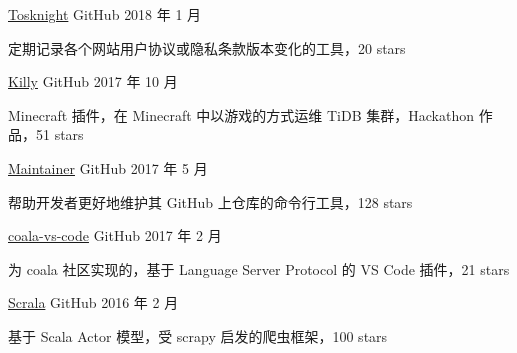 

\begin{cventries}

  \cventry
    {} %
    {\href{https://github.com/siglt/tosknight}{Tosknight}} %
    {GitHub} %
    {2018 年 1 月} %
    {
      \begin{cvitems} %
        \item 定期记录各个网站用户协议或隐私条款版本变化的工具，20 stars
      \end{cvitems}
    }

  \cventry
    {} %
    {\href{https://github.com/prism-river/killy}{Killy}} %
    {GitHub} %
    {2017 年 10 月} %
    {
      \begin{cvitems} %
        \item Minecraft 插件，在 Minecraft 中以游戏的方式运维 TiDB 集群，Hackathon 作品，51 stars
      \end{cvitems}
    }

  \cventry
    {} %
    {\href{https://github.com/gaocegege/maintainer}{Maintainer}} %
    {GitHub} %
    {2017 年 5 月} %
    {
      \begin{cvitems} %
        \item 帮助开发者更好地维护其 GitHub 上仓库的命令行工具，128 stars
      \end{cvitems}
    }

  \cventry
    {} %
    {\href{https://github.com/coala/coala-vs-code}{coala-vs-code}} %
    {GitHub} %
    {2017 年 2 月} %
    {
      \begin{cvitems} %
        \item 为 coala 社区实现的，基于 Language Server Protocol 的 VS Code 插件，21 stars
      \end{cvitems}
    }

  \cventry
    {} %
    {\href{https://github.com/dyweb/scrala}{Scrala}} %
    {GitHub} %
    {2016 年 2 月} %
    {
      \begin{cvitems} %
        \item 基于 Scala Actor 模型，受 scrapy 启发的爬虫框架，100 stars
      \end{cvitems}
    }


\end{cventries}
